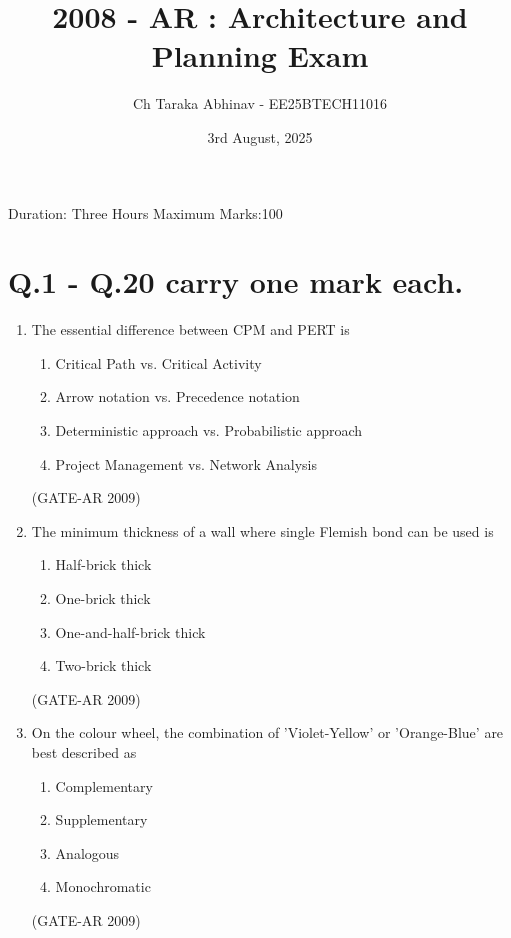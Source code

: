 \documentclass[a4paper,10pt]{article}
\begin{document}
\title{2008 - AR : Architecture and Planning Exam}
\author{Ch Taraka Abhinav - EE25BTECH11016}
\date{3rd August, 2025}
\maketitle
Duration: Three Hours \hfill Maximum Marks:100

\section*{Q.1 - Q.20 carry one mark each.}

\begin{enumerate}
    \item The essential difference between CPM and PERT is 
    \begin{enumerate}
        \item Critical Path vs. Critical Activity
        \item Arrow notation vs. Precedence notation
        \item Deterministic approach vs. Probabilistic approach
        \item Project Management vs. Network Analysis
    \end{enumerate}
    \hfill (GATE-AR 2009)
    
    \item The minimum thickness of a wall where single Flemish bond can be used is 
    \begin{enumerate}
        \item Half-brick thick
        \item One-brick thick
        \item One-and-half-brick thick
        \item Two-brick thick
    \end{enumerate}
    \hfill (GATE-AR 2009)
    
    \item On the colour wheel, the combination of 'Violet-Yellow' or 'Orange-Blue' are best described as 
    \begin{multicols}{4}
	\begin{enumerate}
        \item Complementary
        \item Supplementary
        \item Analogous
        \item Monochromatic
    \end{enumerate}
	\end{multicols}
    \hfill (GATE-AR 2009)
    

\end{enumerate}
\end{document}
